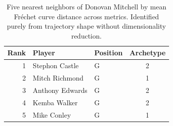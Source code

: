 \begin{table}[htbp]
  \centering\small
  \begin{tabular}{rllc}
    \toprule
    Rank & Player & Position & Archetype \\
    \midrule
    1 & Stephon Castle & G & 2 \\
    2 & Mitch Richmond & G & 1 \\
    3 & Anthony Edwards & G & 2 \\
    4 & Kemba Walker & G & 2 \\
    5 & Mike Conley & G & 1 \\
    \bottomrule
  \end{tabular}
  \caption{Five nearest neighbors of Donovan Mitchell by mean Fr\'{e}chet curve distance across metrics. Identified purely from trajectory shape without dimensionality reduction.}
  \label{tab:Donovan_Mitchell_frechet_curve_neighbors}
\end{table}

